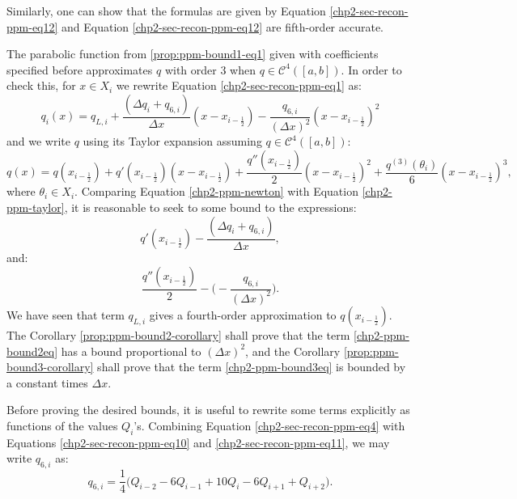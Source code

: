 \begin{remark}
	Similarly, one can show that the formulas are given by Equation
	\eqref{chp2-sec-recon-ppm-eq12} and Equation \eqref{chp2-sec-recon-ppm-eq12}
	are fifth-order accurate.
\end{remark}

The parabolic function from \eqref{prop:ppm-bound1-eq1} given with 
coefficients specified before approximates $q$ with order 3 when 
$q \in \mathcal{C}^4([a,b])$.
In order to check this, for $x \in X_i$ we rewrite Equation 
\eqref{chp2-sec-recon-ppm-eq1} as: 
\begin{equation}
	\label{chp2-ppm-newton}
	q_i(x) = q_{L,i} + \frac{(\Delta q_i + q_{6, i})}{\Delta x}(x-x_{i-\frac{1}{2}})
	-\frac{q_{6, i}}{(\Delta x)^2}(x-x_{i-\frac{1}{2}})^2
\end{equation}
and we write $q$ using its Taylor expansion assuming $q \in \mathcal{C}^4([a,b])$:
\begin{equation}
	\label{chp2-ppm-taylor}
	q(x) = q(x_{i-\frac{1}{2}}) + q'(x_{i-\frac{1}{2}})(x-x_{i-\frac{1}{2}})
	+ \frac{q''(x_{i-\frac{1}{2}})}{2}(x-x_{i-\frac{1}{2}})^2
	+ \frac{q^{(3)}(\theta_i)}{6}(x-x_{i-\frac{1}{2}})^3,
\end{equation}
where $\theta_i \in X_i$.
Comparing Equation \eqref{chp2-ppm-newton} with Equation \eqref{chp2-ppm-taylor},
it is reasonable to seek to some bound to the expressions:
\begin{equation}
	\label{chp2-ppm-bound2eq}
	q'(x_{i-\frac{1}{2}})-\frac{(\Delta q_i + q_{6, i})}{\Delta x},
\end{equation}
and:
\begin{equation} 
	\label{chp2-ppm-bound3eq}
	\frac{q''(x_{i-\frac{1}{2}})}{2} -\bigg(-\frac{q_{6, i}}{(\Delta x)^2}\bigg).
\end{equation}
We have seen that term $q_{L,i}$ gives a fourth-order approximation to $q(x_{i-\frac{1}{2}})$.
The Corollary \ref{prop:ppm-bound2-corollary} shall prove that 
the term \eqref{chp2-ppm-bound2eq} has a bound proportional to $(\Delta x)^2$, and
the Corollary \ref{prop:ppm-bound3-corollary} shall prove that the
term \eqref{chp2-ppm-bound3eq} is bounded by a constant times $\Delta x$.

Before proving the desired bounds, it is useful to rewrite some terms
explicitly as functions of the values $Q_i$'s.
Combining Equation \eqref{chp2-sec-recon-ppm-eq4} with Equations
\eqref{chp2-sec-recon-ppm-eq10} and \eqref{chp2-sec-recon-ppm-eq11}, 
we may write $q_{6,i}$ as:
\begin{equation}
	\label{def:q6i-2}
	q_{6,i} = \frac{1}{4} \bigg( Q_{i-2} - 6Q_{i-1} + 10Q_{i} -6Q_{i+1}  + Q_{i+2} \bigg).
\end{equation}

